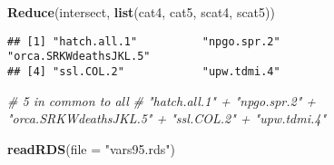 \documentclass[]{article}
\newenvironment{Shaded}{\begin{snugshade}}{\end{snugshade}}
\newcommand{\KeywordTok}[1]{\textcolor[rgb]{0.13,0.29,0.53}{\textbf{{#1}}}}
\newcommand{\DataTypeTok}[1]{\textcolor[rgb]{0.13,0.29,0.53}{{#1}}}
\newcommand{\StringTok}[1]{\textcolor[rgb]{0.31,0.60,0.02}{{#1}}}
\newcommand{\CommentTok}[1]{\textcolor[rgb]{0.56,0.35,0.01}{\textit{{#1}}}}
\newcommand{\NormalTok}[1]{{#1}}
\begin{document}
\begin{Shaded}
\begin{Highlighting}[]
\KeywordTok{Reduce}\NormalTok{(intersect, }\KeywordTok{list}\NormalTok{(cat4, cat5, scat4, scat5))}
\end{Highlighting}
\end{Shaded}

\begin{verbatim}
## [1] "hatch.all.1"          "npgo.spr.2"           "orca.SRKWdeathsJKL.5"
## [4] "ssl.COL.2"            "upw.tdmi.4"
\end{verbatim}

\begin{Shaded}
\begin{Highlighting}[]
\CommentTok{# 5 in common to all}
\CommentTok{# "hatch.all.1" + "npgo.spr.2" + "orca.SRKWdeathsJKL.5" + "ssl.COL.2" + "upw.tdmi.4"}

\KeywordTok{readRDS}\NormalTok{(}\DataTypeTok{file =} \StringTok{"vars95.rds"}\NormalTok{)}
\end{Highlighting}
\end{Shaded}
\end{document}
